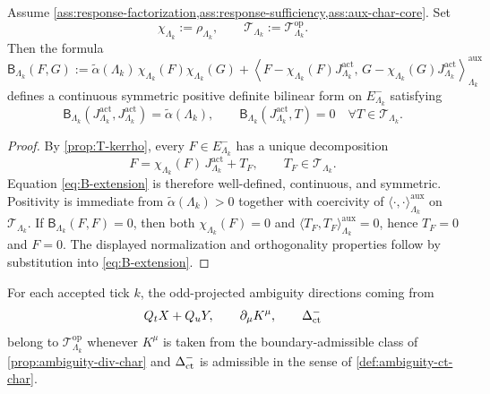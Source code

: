 \documentclass[11pt]{article}
\begin{document}
\begin{proposition}
\label{prop:char-calibration-extension}
Assume \cref{ass:response-factorization,ass:response-sufficiency,ass:aux-char-core}. Set
\[
\chi_{\Lambda_k}:=\rho_{\Lambda_k},
\qquad
\mathcal T_{\Lambda_k}:=\mathcal T^{\mathrm{op}}_{\Lambda_k}.
\]
Then the formula
\begin{equation}
\mathsf B_{\Lambda_k}(F,G)
:=
\widetilde\alpha(\Lambda_k)\,\chi_{\Lambda_k}(F)\chi_{\Lambda_k}(G)
+
\left\langle
F-\chi_{\Lambda_k}(F)J^{\mathrm{act}}_{\Lambda_k},
\,G-\chi_{\Lambda_k}(G)J^{\mathrm{act}}_{\Lambda_k}
\right\rangle^{\mathrm{aux}}_{\Lambda_k}
\label{eq:B-extension}
\end{equation}
defines a continuous symmetric positive definite bilinear form on \(E^-_{\Lambda_k}\) satisfying
\[
\mathsf B_{\Lambda_k}(J^{\mathrm{act}}_{\Lambda_k},J^{\mathrm{act}}_{\Lambda_k})
=
\widetilde\alpha(\Lambda_k),
\qquad
\mathsf B_{\Lambda_k}(J^{\mathrm{act}}_{\Lambda_k},T)=0
\quad
\forall T\in\mathcal T_{\Lambda_k}.
\]
\end{proposition}

\begin{proof}
By \cref{prop:T-kerrho}, every \(F\in E^-_{\Lambda_k}\) has a unique decomposition
\[
F=\chi_{\Lambda_k}(F)\,J^{\mathrm{act}}_{\Lambda_k}+T_F,
\qquad
T_F\in \mathcal T_{\Lambda_k}.
\]
Equation \eqref{eq:B-extension} is therefore well-defined, continuous, and symmetric.
Positivity is immediate from \(\widetilde\alpha(\Lambda_k)>0\) together with coercivity of
\(\langle\cdot,\cdot\rangle^{\mathrm{aux}}_{\Lambda_k}\) on \(\mathcal T_{\Lambda_k}\).
If \(\mathsf B_{\Lambda_k}(F,F)=0\), then both \(\chi_{\Lambda_k}(F)=0\) and
\(\langle T_F,T_F\rangle^{\mathrm{aux}}_{\Lambda_k}=0\), hence \(T_F=0\) and \(F=0\).
The displayed normalization and orthogonality properties follow by substitution into
\eqref{eq:B-extension}.
\end{proof}

\begin{corollary}
\label{cor:ambiguity-char}
For each accepted tick \(k\), the odd-projected ambiguity directions coming from
\[
Q_tX+Q_uY,
\qquad
\partial_\mu K^\mu,
\qquad
\Delta_{\rm ct}^{-}
\]
belong to \(\mathcal T^{\mathrm{op}}_{\Lambda_k}\) whenever \(K^\mu\) is taken from the
boundary-admissible class of \cref{prop:ambiguity-div-char} and \(\Delta_{\rm ct}^{-}\) is
admissible in the sense of \cref{def:ambiguity-ct-char}.
\end{corollary}
\end{document}
